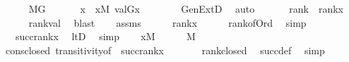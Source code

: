 \begin{isabellebody}
\isanewline
{}\isamarkupfalse%
\isanewline
\ \ \isamarkupfalse%
\ {\isachardoublequoteopen}{\isasymalpha}\ {\isasymin}\ M{\isacharbrackleft}{\kern0pt}G{\isacharbrackright}{\kern0pt}{\isachardoublequoteclose}\isanewline
\ \ \isamarkupfalse%
\isanewline
\ \ \isamarkupfalse%
\ x\ \ {\isachardoublequoteopen}x{\isasymin}M{\isachardoublequoteclose}\ {\isachardoublequoteopen}val{\isacharparenleft}{\kern0pt}G{\isacharcomma}{\kern0pt}x{\isacharparenright}{\kern0pt}\ {\isacharequal}{\kern0pt}\ {\isasymalpha}{\isachardoublequoteclose}\isanewline
\ \ \ \ \isamarkupfalse%
\ GenExtD\ \isamarkupfalse%
\ auto\isanewline
\ \ \isamarkupfalse%
\isanewline
\ \ \isamarkupfalse%
\ {\isachardoublequoteopen}rank{\isacharparenleft}{\kern0pt}{\isasymalpha}{\isacharparenright}{\kern0pt}\ {\isasymle}\ rank{\isacharparenleft}{\kern0pt}x{\isacharparenright}{\kern0pt}{\isachardoublequoteclose}\ \isanewline
\ \ \ \ \isamarkupfalse%
\ rank{\isacharunderscore}{\kern0pt}val\ \isamarkupfalse%
\ blast\isanewline
\ \ \isamarkupfalse%
\ assms\isanewline
\ \ \isamarkupfalse%
\ {\isachardoublequoteopen}{\isasymalpha}\ {\isasymle}\ rank{\isacharparenleft}{\kern0pt}x{\isacharparenright}{\kern0pt}{\isachardoublequoteclose}\isanewline
\ \ \ \ \isamarkupfalse%
\ rank{\isacharunderscore}{\kern0pt}of{\isacharunderscore}{\kern0pt}Ord\ \isamarkupfalse%
\ simp\isanewline
\ \ \isamarkupfalse%
\ \isanewline
\ \ \isamarkupfalse%
\ {\isachardoublequoteopen}{\isasymalpha}\ {\isasymin}\ succ{\isacharparenleft}{\kern0pt}rank{\isacharparenleft}{\kern0pt}x{\isacharparenright}{\kern0pt}{\isacharparenright}{\kern0pt}{\isachardoublequoteclose}\ \isamarkupfalse%
\ ltD\ \isamarkupfalse%
\ simp\isanewline
\ \ \isamarkupfalse%
\ {\isacartoucheopen}x{\isasymin}M{\isacartoucheclose}\isanewline
\ \ \isamarkupfalse%
\ {\isachardoublequoteopen}{\isasymalpha}\ {\isasymin}\ M{\isachardoublequoteclose}\isanewline
\ \ \ \ \isamarkupfalse%
\ cons{\isacharunderscore}{\kern0pt}closed\ transitivity{\isacharbrackleft}{\kern0pt}of\ {\isasymalpha}\ {\isachardoublequoteopen}succ{\isacharparenleft}{\kern0pt}rank{\isacharparenleft}{\kern0pt}x{\isacharparenright}{\kern0pt}{\isacharparenright}{\kern0pt}{\isachardoublequoteclose}{\isacharbrackright}{\kern0pt}\ \isanewline
\ \ \ \ \ \ rank{\isacharunderscore}{\kern0pt}closed\ \isamarkupfalse%
\ succ{\isacharunderscore}{\kern0pt}def\ \isamarkupfalse%
\ simp\ \ \isanewline
{}\isamarkupfalse%
%
\endisatagproof
{\isafoldproof}%
%
\isadelimproof
\isanewline
%
\endisadelimproof
\ \ \isanewline
{}\isamarkupfalse%
\ \isanewline
%
\isadelimtheory
\isanewline
%
\endisadelimtheory
%
\isatagtheory
{}\isamarkupfalse%
%
\endisatagtheory
{\isafoldtheory}%
%
\isadelimtheory
%
\endisadelimtheory
%
\end{isabellebody}%

